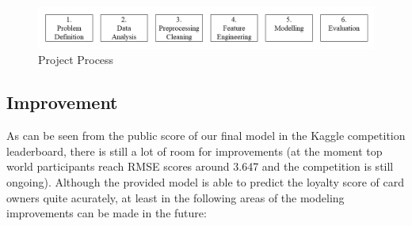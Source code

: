 \documentclass{article}
\begin{document}
\begin{figure}[h]
  \centering
  \includegraphics[width=350pt]{process}
  \caption{Project Process}
  \label{fig:process}
\end{figure}

\subsection{Improvement}


As can be seen from the public score of our final model in the Kaggle competition leaderboard, there is still a lot of room for improvements (at the moment top world participants reach RMSE scores around 3.647 and the competition is still ongoing). Although the provided model is able to predict the loyalty score of card owners quite acurately, at least in the following areas of the modeling improvements can be made in the future:
\end{document}
